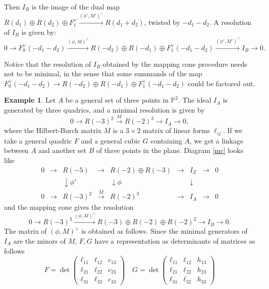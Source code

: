 \documentclass{amsart}
\newcommand{\Pj}{\mathbb{P}}
\theoremstyle{definition}
\newtheorem{exa0}[thm0]{Example}
\begin{document}
Then $I_B$ is the image of the dual map $  R(d_1)\oplus R(d_2) \oplus F_1^\vee \xrightarrow{(\phi', M')^\vee} R(d_1+d_2)$, twisted by $-d_1-d_2$. A resolution of $I_B$ is given by:
$$0 \to F_0^\vee(-d_1-d_2) \xrightarrow {(\phi,M)^\vee} R(-d_2)\oplus R(-d_1) \oplus F_1^\vee(-d_1-d_2) \xrightarrow {(\phi', M')^\vee} I_B \to 0.$$

Notice that the resolution of $I_B$ obtained by the mapping cone procedure needs not to be minimal, in the sense that some summands of the map
$F_0^\vee(-d_1-d_2) \to R(-d_2)\oplus R(-d_1) \oplus F_1^\vee(-d_1-d_2) $ could be factored out.

\begin{exa0} Let $A$ be a general set of three points in $\Pj^2$. The ideal $I_A$ is generated by three quadrics, and a minimal resolution is given by
 $$0 \longrightarrow R(-3)^2\xrightarrow M  R(-2)^3 \longrightarrow I_A \longrightarrow 0,$$
 where the Hilbert-Burch matrix $M$ is a $3\times 2$ matrix of linear forms $\ell_{ij}$.
 If we take a general quadric $F$ and a general cubic $G$ containing $A$, we get a linkage between $A$ and another set $B$ of three points in the plane.
 Diagram \eqref{mc} looks like
 $$ \begin{matrix}
  0 & \longrightarrow & R(-5) & \longrightarrow  &  R(-2)\oplus R(-3) & \longrightarrow & I_Z &\longrightarrow & 0  \\
   &                            & \downarrow \phi' &                        & \downarrow    \phi         &                            &  \downarrow   &        &      \\
0 &\longrightarrow  & R(-3)^2               & \xrightarrow M     & R(-2)^3                      & \longrightarrow & I_A &\longrightarrow & 0
\end{matrix} $$
and the mapping cone gives the resolution
$$0 \to R(-3)^3 \xrightarrow {(\phi, M)^\vee} R(-3) \oplus R(-2) \oplus R(-2)^2  \longrightarrow  I_B \to 0.$$
The matrix of $(\phi,M)^\vee$ is obtained as follows. Since the minimal generators of $I_A$ are the minors of $M$, $F,G$ have a
representation as determinants of matrices as follows
$$ F=\det\begin{pmatrix} \ell_{11} & \ell_{12} & c_{13} \\  \ell_{21} & \ell_{22} & c_{23} \\ \ell_{31} & \ell_{32} & c_{33}\end{pmatrix} \quad
G=\det\begin{pmatrix} \ell_{11} & \ell_{12} & h_{13} \\  \ell_{21} &\ell_{22} & h_{23} \\  \ell_{31} & \ell_{32} & h_{33}\end{pmatrix}
$$
\end{exa0}
\end{document}
